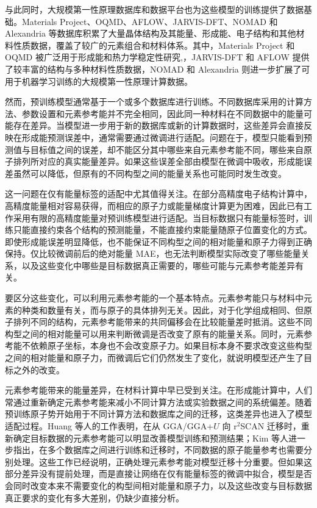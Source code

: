 \documentclass[UTF8,a4paper,12pt,fontset=fandol]{ctexart}
\begin{document}
与此同时，大规模第一性原理数据库和数据平台也为这些模型的训练提供了数据基础\cite{batra2021emerging}。Materials Project、OQMD、AFLOW、JARVIS-DFT、NOMAD 和 Alexandria 等数据库积累了大量晶体结构及其能量、形成能、电子结构和其他材料性质数据，覆盖了较广的元素组合和材料体系。其中，Materials Project 和 OQMD 被广泛用于形成能和热力学稳定性研究\cite{jain2013commentary,kirklin2015open},，JARVIS-DFT 和 AFLOW 提供了较丰富的结构与多种材料性质数据\cite{curtarolo2012aflowlib,choudhary2020joint}，NOMAD 和 Alexandria 则进一步扩展了可用于机器学习训练的大规模第一性原理计算数据\cite{draxl2018nomad,schmidt2024improving}。

然而，预训练模型通常基于一个或多个数据库进行训练。不同数据库采用的计算方法、参数设置和元素参考能并不完全相同，因此同一种材料在不同数据中的能量可能存在差异\cite{hegde2023quantifying}。当模型进一步用于新的数据库或新的计算数据时，这些差异会直接反映在形成能预测误差中，通常需要通过微调进行适配\cite{huang2025cross}。问题在于，模型只能看到预测值与目标值之间的误差，却不能区分其中哪些来自元素参考能不同，哪些来自原子排列所对应的真实能量差异。如果这些误差全部由模型在微调中吸收，形成能误差虽然可以降低，但原有的不同构型之间的能量关系也可能同时发生改变。

这一问题在仅有能量标签的适配中尤其值得关注。在部分高精度电子结构计算中，高精度能量相对容易获得，而相应的原子力或能量梯度计算更为困难\cite{messerly2025multi}，因此已有工作采用有限的高精度能量对预训练模型进行适配\cite{zaverkin2023transfer}。当目标数据只有能量标签时，训练只能直接约束各个结构的预测能量，不能直接约束能量随原子位置变化的方式\cite{christensen2020role}。即使形成能误差明显降低，也不能保证不同构型之间的相对能量和原子力得到正确保持。仅比较微调前后的绝对能量 MAE，也无法判断模型实际改变了哪些能量关系，以及这些变化中哪些是目标数据真正需要的，哪些可能与元素参考能差异有关。

要区分这些变化，可以利用元素参考能的一个基本特点。元素参考能只与材料中元素的种类和数量有关，而与原子的具体排列无关\cite{friedrich2019coordination}。因此，对于化学组成相同、但原子排列不同的结构，元素参考能带来的共同偏移会在比较能量差时抵消。这些不同构型之间的相对能量可以用来判断微调是否改变了原有的能量关系。同时，元素参考能不依赖原子坐标，本身也不会改变原子力。如果目标本身不要求改变这些构型之间的相对能量和原子力，而微调后它们仍然发生了变化，就说明模型还产生了目标之外的改变。

元素参考能带来的能量差异，在材料计算中早已受到关注。在形成能计算中，人们常通过重新确定元素参考能来减小不同计算方法或实验数据之间的系统偏差\cite{stevanovic2012correcting}。随着预训练原子势开始用于不同计算方法和数据库之间的迁移，这类差异也进入了模型适配过程。Huang 等人的工作表明，在从 GGA/GGA+$U$ 向 r$^2$SCAN 迁移时，重新确定目标数据的元素参考能可以明显改善模型训练和预测结果\cite{huang2025cross}；Kim 等人进一步指出，在多个数据库之间进行训练和迁移时，不同数据的原子能量参考也需要分别处理\cite{kim2026optimizing}。这些工作已经说明，正确处理元素参考能对模型迁移十分重要。但如果这部分差异没有提前处理，而是直接让网络在仅有能量标签的微调中拟合，模型是否会同时改变本来不需要变化的构型间相对能量和原子力，以及这些改变与目标数据真正要求的变化有多大差别，仍缺少直接分析。
\end{document}
